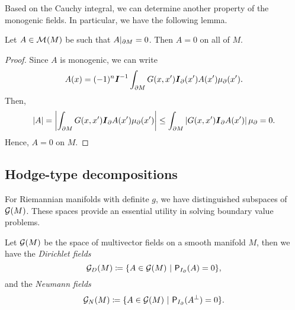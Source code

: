 Based on the Cauchy integral, we can determine another property of the monogenic fields. In particular, we have the following lemma.

\begin{lemma}
\label{lem:monogenic_zero}
Let $A \in \mathcal{M}^{}(M)$ be such that $A\vert_{\partial M} = 0$. Then $A=0$ on all of $M$.
\end{lemma}
\begin{proof}
Since $A$ is monogenic, we can write
\begin{equation}
A(x) = (-1)^n \boldsymbol{I}^{-1}\int_{\partial M} G(x,x') \boldsymbol{I}_\partial(x') A(x') \mu_\partial(x').
\end{equation}
Then,
\begin{equation}
|A| = \left| \int_{\partial M} G(x,x') \boldsymbol{I}_\partial A(x') \mu_\partial(x')\right| \leq \int_{\partial M} \left| G(x,x') \boldsymbol{I}_\partial A(x')\right| \mu_\partial = 0.
\end{equation}
Hence, $A=0$ on $M$.
\end{proof}




\subsection{Hodge-type decompositions}

For Riemannian manifolds with definite $g$, we have distinguished subspaces of $\mathcal{G}(M)$. These spaces provide an essential utility in solving boundary value problems.
\begin{definition}
\label{def:dirichlet_neumann}
Let $\mathcal{G}(M)$ be the space of multivector fields on a smooth manifold $M$, then we have the \emph{Dirichlet fields}
\begin{equation}
\mathcal{G}_D(M) \coloneqq \{A \in \mathcal{G}(M) ~\vert~ \mathsf{P}_{I_{\partial}}(A) = 0 \},
\end{equation}
and the \emph{Neumann fields}
\begin{equation}
\mathcal{G}_N(M) \coloneqq \{A \in \mathcal{G}(M) ~\vert~ \mathsf{P}_{I_{\partial}}(A^\perp) = 0 \}.
\end{equation}
\end{definition}

